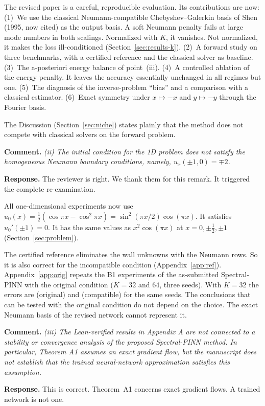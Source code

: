 \documentclass[11pt]{article}
\newcommand{\rc}[1]{\par\medskip\noindent\textbf{Comment.} \emph{#1}\par\smallskip\noindent\textbf{Response.} }
\begin{document}
The revised paper is a careful, reproducible evaluation. Its contributions are now:
(1)~We use the classical Neumann-compatible Chebyshev--Galerkin basis of Shen (1995, now cited) as the output basis. A soft Neumann penalty fails at large mode numbers in both scalings. Normalized with $K$, it vanishes. Not normalized, it makes the loss ill-conditioned (Section~\ref{sec:results-k}).
(2)~A forward study on three benchmarks, with a certified reference and the classical solver as baseline.
(3)~The a-posteriori energy balance of point~(iii).
(4)~A controlled ablation of the energy penalty. It leaves the accuracy essentially unchanged in all regimes but one.
(5)~The diagnosis of the inverse-problem ``bias'' and a comparison with a classical estimator.
(6)~Exact symmetry under $x\mapsto-x$ and $y\mapsto-y$ through the Fourier basis.

The Discussion (Section~\ref{sec:niche}) states plainly that the method does not compete with classical solvers on the forward problem.

\rc{(ii) The initial condition for the 1D problem does not satisfy the homogeneous Neumann boundary conditions, namely, $u_x(\pm1,0)=\mp2$.}
The reviewer is right. We thank them for this remark. It triggered the complete re-examination.

All one-dimensional experiments now use $u_0(x)=\frac12(\cos\pi x-\cos^2\pi x)=\sin^2(\pi x/2)\cos(\pi x)$. It satisfies $u_0'(\pm1)=0$. It has the same values as $x^2\cos(\pi x)$ at $x=0,\pm\frac12,\pm1$ (Section~\ref{sec:problem}).

The certified reference eliminates the wall unknowns with the Neumann rows. So it is also correct for the incompatible condition (Appendix~\ref{app:ref}). Appendix~\ref{app:orig} repeats the B1 experiments of the as-submitted Spectral-PINN with the original condition ($K=32$ and $64$, three seeds). With $K=32$ the errors are  (original) and  (compatible) for the same seeds. The conclusions that can be tested with the original condition do not depend on the choice. The exact Neumann basis of the revised network cannot represent it.

\rc{(iii) The Lean-verified results in Appendix A are not connected to a stability or convergence analysis of the proposed Spectral-PINN method. In particular, Theorem A1 assumes an exact gradient flow, but the manuscript does not establish that the trained neural-network approximation satisfies this assumption.}
This is correct. Theorem~A1 concerns exact gradient flows. A trained network is not one.
\end{document}
